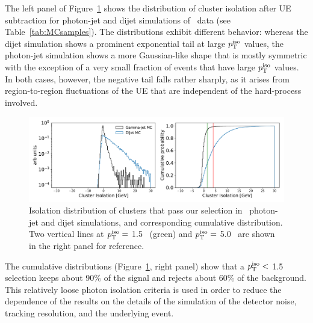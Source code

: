 The left panel of Figure~\ref{MC_Isolation} shows the distribution of cluster isolation after UE subtraction for photon-jet and dijet simulations of \pPb~data (see Table~\ref{tab:MCsamples}). The distributions exhibit different behavior: whereas the dijet simulation shows a prominent exponential tail at large $p_{\mathrm{T}}^\mathrm{iso}$ values, the photon-jet simulation shows a more Gaussian-like shape that is mostly symmetric with the exception of a very small fraction of events that have large $p_{\mathrm{T}}^\mathrm{iso}$ values. In both cases, however, the negative tail falls rather sharply, as it arises from region-to-region fluctuations of the UE that are independent of the hard-process involved. 

\begin{figure}[hbtp]
\center
\includegraphics[width=1.0\textwidth]{Data_Analysis/Isolation/IsolationMCsignal_Skimmed_17g6a1_pthat1_4L_root}
\caption{Isolation distribution of clusters that pass our selection in \pPb~photon-jet and dijet simulations, and corresponding cumulative distribution. Two vertical lines at $p_{\mathrm{T}}^\mathrm{iso}=$ 1.5 \GeVc~(green) and $p_{\mathrm{T}}^\mathrm{iso}=$ 5.0 \GeVc~are shown in the right panel for reference.}
\label{MC_Isolation}
\end{figure}


The cumulative distributions (Figure~\ref{MC_Isolation}, right panel) show that a {$p_{\mathrm{T}}^\mathrm{iso}<$ 1.5 \GeVc} selection keeps about 90$\%$ of the signal and rejects about 60$\%$ of the background. This relatively loose photon isolation criteria is used in order to reduce the dependence of the results on the details of the simulation of the detector noise, tracking resolution, and the underlying event. 


